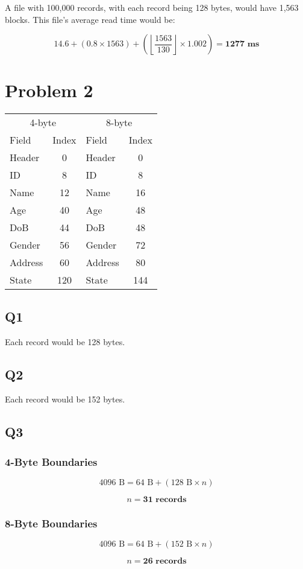 \documentclass[a4paper, 12pt]{article}
\begin{document}
A file with 100,000 records, with each record being 128 bytes, would have 1,563
blocks. This file's average read time would be:

\[ 14.6 + (0.8 \times 1563) + \left ( \left \lfloor{\frac{1563}{130}}\right
				\rfloor \times 1.002 \right ) = \textbf{1277 ms} \]

\section*{Problem 2}

\begin{table}[h]
	\centering
	\begin{tabular}{ l c | l c }
		\multicolumn{2}{c}{4-byte} &
		\multicolumn{2}{c}{8-byte} \\

		Field & Index & Field & Index \\
		
		\hline
	
		Header & 0 & Header & 0\\
		ID & 8 & ID & 8 \\
		Name & 12 & Name & 16 \\
		Age & 40 & Age & 48 \\
		DoB & 44 & DoB & 48 \\
		Gender & 56 & Gender & 72 \\
		Address & 60 & Address & 80 \\
		State & 120 & State & 144
	\end{tabular}
\end{table}

\subsection*{Q1}

Each record would be 128 bytes.

\subsection*{Q2}

Each record would be 152 bytes.

\subsection*{Q3}

\subsubsection*{4-Byte Boundaries}

\[ 4096 \text{ B} = 64 \text{ B} + ( 128 \text{ B} \times n ) \]

\[ n = \textbf{31 records} \]

\subsubsection*{8-Byte Boundaries}

\[ 4096 \text{ B} = 64 \text{ B} + ( 152 \text{ B} \times n ) \]

\[ n = \textbf{26 records} \]
\end{document}
